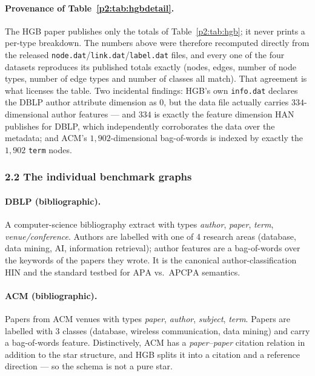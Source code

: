 \paragraph{Provenance of Table~\ref{p2:tab:hgbdetail}.} The HGB paper publishes only the totals of
Table~\ref{p2:tab:hgb}; it never prints a per-type breakdown. The numbers above were therefore
recomputed directly from the released \texttt{node.dat}/\texttt{link.dat}/\texttt{label.dat} files,
and every one of the four datasets reproduces its published totals exactly (nodes, edges, number of
node types, number of edge types and number of classes all match). That agreement is what licenses
the table. Two incidental findings: HGB's own \texttt{info.dat} declares the DBLP author attribute
dimension as $0$, but the data file actually carries $334$-dimensional author features --- and $334$
is exactly the feature dimension HAN publishes for DBLP, which independently corroborates the data
over the metadata; and ACM's $1{,}902$-dimensional bag-of-words is indexed by exactly the $1{,}902$
\texttt{term} nodes.

\subsubsection*{2.2 The individual benchmark graphs}

\paragraph{DBLP (bibliographic).} A computer-science bibliography extract with types
\emph{author}, \emph{paper}, \emph{term}, \emph{venue/conference}. Authors are labelled with one of
4 research areas (database, data mining, AI, information retrieval); author features are a
bag-of-words over the keywords of the papers they wrote. It is the canonical author-classification
HIN and the standard testbed for $\mathrm{APA}$ vs.\ $\mathrm{APCPA}$ semantics.

\paragraph{ACM (bibliographic).} Papers from ACM venues with types \emph{paper}, \emph{author},
\emph{subject}, \emph{term}. Papers are labelled with 3 classes (database, wireless communication,
data mining) and carry a bag-of-words feature. Distinctively, ACM has a \emph{paper--paper}
citation relation in addition to the star structure, and HGB splits it into a citation and a
reference direction --- so the schema is not a pure star.

